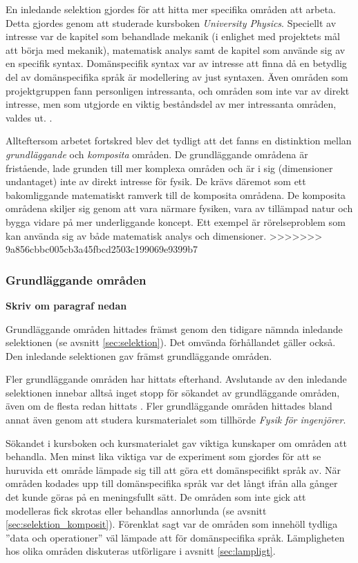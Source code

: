 \begin{binge}
En inledande selektion gjordes för att hitta mer specifika områden att arbeta. Detta gjordes genom att studerade kursboken \textit{University Physics}. Speciellt av intresse var de kapitel som behandlade mekanik (i enlighet med projektets mål att börja med mekanik), matematisk analys samt de kapitel som använde sig av en specifik syntax. Domänspecifik syntax var av intresse att finna då en betydlig del av domänspecifika språk är modellering av just syntaxen. Även områden som projektgruppen fann personligen intressanta, och områden som inte var av direkt intresse, men som utgjorde en viktig beståndsdel av mer intressanta områden, valdes ut. .

Allteftersom arbetet fortskred blev det tydligt att det fanns en distinktion mellan \textit{grundläggande} och \textit{komposita} områden. De grundläggande områdena är fristående, lade grunden till mer komplexa områden och är i sig (dimensioner undantaget) inte av direkt intresse för fysik. De krävs däremot som ett bakomliggande matematiskt ramverk till de komposita områdena.  De komposita områdena skiljer sig genom att vara närmare fysiken, vara av tillämpad natur och bygga vidare på mer underliggande koncept. Ett exempel är rörelseproblem som kan använda sig av både matematisk analys och dimensioner.
>>>>>>> 9a856cbbc005cb3a45fbcd2503c199069e9399b7

\subsubsection{Grundläggande områden}

\textbf{Skriv om paragraf nedan}

Grundläggande områden hittades främst genom den tidigare nämnda inledande
selektionen (se avsnitt \ref{sec:selektion}). Det omvända förhållandet gäller
också. Den inledande selektionen gav främst grundläggande områden. 

Fler grundläggande områden har hittats efterhand. Avslutande av den inledande
selektionen innebar alltså inget stopp för sökandet av grundläggande områden,
även om de flesta redan hittats . Fler grundläggande områden hittades bland
annat även genom att studera kursmaterialet som tillhörde \textit{Fysik för
ingenjörer}.

Sökandet i kursboken och kursmaterialet gav viktiga kunskaper om områden att
behandla. Men minst lika viktiga var de experiment som gjordes för att se
huruvida ett område lämpade sig till att göra ett domänspecifikt språk av. När
områden kodades upp till domänspecifika språk var det långt ifrån alla gånger
det kunde göras på en meningsfullt sätt. De områden som inte gick att
modelleras fick skrotas eller behandlas annorlunda (se avsnitt
\ref{sec:selektion_komposit}). Förenklat sagt var de områden som innehöll
tydliga ''data och operationer'' väl lämpade att för domänspecifika språk.
Lämpligheten hos olika områden diskuteras utförligare i avsnitt
\ref{sec:lampligt}.


\end{binge}
